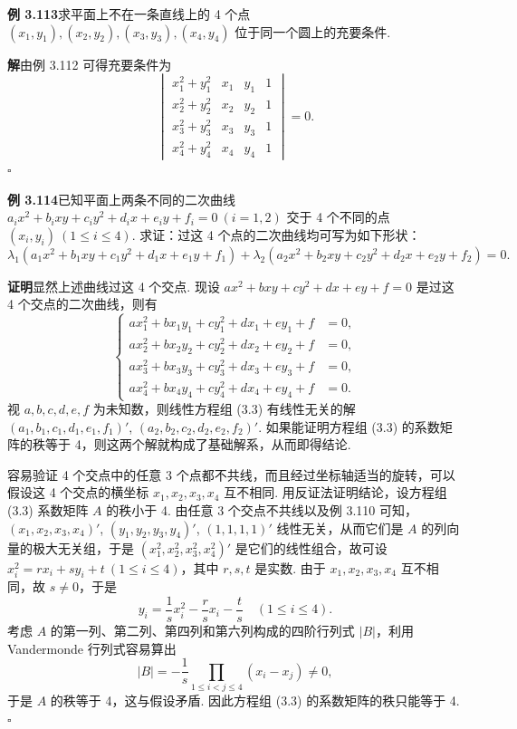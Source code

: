 \documentclass[UTF8,12pt,a4paper,fontset=fandol]{ctexart}
\begin{document}
\noindent\textbf{例 3.113}\quad 求平面上不在一条直线上的 4 个点 $(x_1,y_1),(x_2,y_2),(x_3,y_3),(x_4,y_4)$ 位于同一个圆上的充要条件.

\noindent\textbf{解}\quad 由例 3.112 可得充要条件为
\[
\begin{vmatrix}
x_1^2+y_1^2&x_1&y_1&1\\
x_2^2+y_2^2&x_2&y_2&1\\
x_3^2+y_3^2&x_3&y_3&1\\
x_4^2+y_4^2&x_4&y_4&1
\end{vmatrix}=0.
\]
$\square$

\noindent\textbf{例 3.114}\quad 已知平面上两条不同的二次曲线 $a_ix^2+b_ixy+c_iy^2+d_ix+e_iy+f_i=0\ (i=1,2)$ 交于 4 个不同的点 $(x_i,y_i)\ (1\le i\le 4)$. 求证：过这 4 个点的二次曲线均可写为如下形状：
\[
\lambda_1(a_1x^2+b_1xy+c_1y^2+d_1x+e_1y+f_1)+\lambda_2(a_2x^2+b_2xy+c_2y^2+d_2x+e_2y+f_2)=0.
\]

\noindent\textbf{证明}\quad 显然上述曲线过这 4 个交点. 现设 $ax^2+bxy+cy^2+dx+ey+f=0$ 是过这 4 个交点的二次曲线，则有
\begin{equation}
\left\{
\begin{aligned}
ax_1^2+bx_1y_1+cy_1^2+dx_1+ey_1+f&=0,\\
ax_2^2+bx_2y_2+cy_2^2+dx_2+ey_2+f&=0,\\
ax_3^2+bx_3y_3+cy_3^2+dx_3+ey_3+f&=0,\\
ax_4^2+bx_4y_4+cy_4^2+dx_4+ey_4+f&=0.
\end{aligned}
\right.
\tag{3.3}
\end{equation}
视 $a,b,c,d,e,f$ 为未知数，则线性方程组 (3.3) 有线性无关的解 $(a_1,b_1,c_1,d_1,e_1,f_1)'$, $(a_2,b_2,c_2,d_2,e_2,f_2)'$. 如果能证明方程组 (3.3) 的系数矩阵的秩等于 4，则这两个解就构成了基础解系，从而即得结论.

容易验证 4 个交点中的任意 3 个点都不共线，而且经过坐标轴适当的旋转，可以假设这 4 个交点的横坐标 $x_1,x_2,x_3,x_4$ 互不相同. 用反证法证明结论，设方程组 (3.3) 系数矩阵 $A$ 的秩小于 4. 由任意 3 个交点不共线以及例 3.110 可知，$(x_1,x_2,x_3,x_4)'$, $(y_1,y_2,y_3,y_4)'$, $(1,1,1,1)'$ 线性无关，从而它们是 $A$ 的列向量的极大无关组，于是 $(x_1^2,x_2^2,x_3^2,x_4^2)'$ 是它们的线性组合，故可设 $x_i^2=rx_i+sy_i+t\ (1\le i\le 4)$，其中 $r,s,t$ 是实数. 由于 $x_1,x_2,x_3,x_4$ 互不相同，故 $s\ne 0$，于是
\[
y_i=\frac{1}{s}x_i^2-\frac{r}{s}x_i-\frac{t}{s}\quad (1\le i\le 4).
\]
考虑 $A$ 的第一列、第二列、第四列和第六列构成的四阶行列式 $|B|$，利用 Vandermonde 行列式容易算出
\[
|B|=-\frac{1}{s}\prod_{1\le i<j\le 4}(x_i-x_j)\ne 0,
\]
于是 $A$ 的秩等于 4，这与假设矛盾. 因此方程组 (3.3) 的系数矩阵的秩只能等于 4. $\square$
\end{document}
